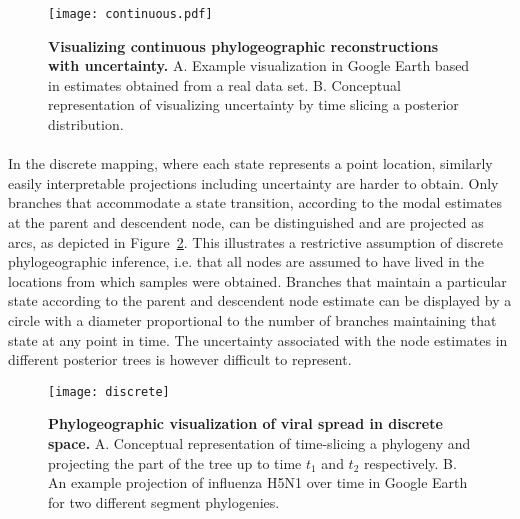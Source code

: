 \begin{figure}[h!]
\centering
\texttt{[image: continuous.pdf]}
\caption{
{ \footnotesize 
{\bf Visualizing continuous phylogeographic reconstructions with uncertainty.} 
A. Example visualization in Google Earth based in estimates obtained from a real data set. B. Conceptual representation of visualizing uncertainty by time slicing a posterior distribution.
} %
}
\label{fig:cont}
\end{figure}


\paragraph{}
In the discrete mapping, where each state represents a point location, similarly easily interpretable projections including uncertainty are harder to obtain.
Only branches that accommodate a state transition, according to the modal estimates at the parent and descendent node, can be distinguished and are projected as arcs, as depicted in Figure~\ref{fig:discrete}.
This illustrates a restrictive assumption of discrete phylogeographic inference, i.e. that all nodes are assumed to have lived in the locations from which samples were obtained.
Branches that maintain a particular state according to the parent and descendent node estimate can be displayed by a circle with a diameter proportional to the number of branches maintaining that state at any point in time.
The uncertainty associated with the node estimates in different posterior trees is however difficult to represent.

\begin{figure}[h!]
\centering
\texttt{[image: discrete]}
\caption{
{ \footnotesize 
{\bf Phylogeographic visualization of viral spread in discrete space.} 
A. Conceptual representation of time-slicing a phylogeny and projecting the part of the tree up to time $t_{1}$ and $t_{2}$ respectively. 
B. An example projection of influenza H5N1 over time in Google Earth for two different segment phylogenies. %
} %
}
\label{fig:discrete}
\end{figure}

